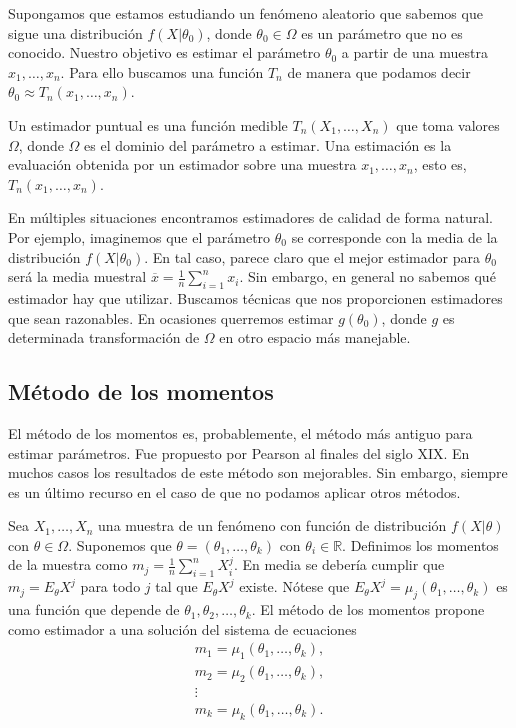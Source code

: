 \documentclass{article}
\begin{document}
Supongamos que estamos estudiando un fenómeno aleatorio que sabemos que sigue una distribución $f(X | \theta_0)$, donde $\theta_0 \in \Omega$ es un parámetro que no es conocido. Nuestro objetivo es estimar el parámetro $\theta_0$ a partir de una muestra $x_1, \ldots, x_n$. Para ello buscamos una función $T_n$ de manera que podamos decir $\theta_0 \approx T_n(x_1, \ldots, x_n)$.

\begin{definition}
    Un estimador puntual es una función medible $T_n(X_1, \ldots, X_n)$ que toma valores $\Omega$, donde $\Omega$ es el dominio del parámetro a estimar. Una estimación es la evaluación obtenida por un estimador sobre una muestra $x_1, \ldots, x_n$, esto es, $T_n(x_1, \ldots, x_n)$.
\end{definition}

En múltiples situaciones encontramos estimadores de calidad de forma natural. Por ejemplo, imaginemos que el parámetro $\theta_0$ se corresponde con la media de la distribución $f(X | \theta_0)$. En tal caso, parece claro que el mejor estimador para $\theta_0$ será la media muestral $\overline{x} = \frac{1}{n}\sum_{i = 1}^n x_i$. Sin embargo, en general no sabemos qué estimador hay que utilizar. Buscamos técnicas que nos proporcionen estimadores que sean razonables. En ocasiones querremos estimar $g(\theta_0)$, donde $g$ es determinada transformación de $\Omega$ en otro espacio más manejable.

\subsection{Método de los momentos}

El método de los momentos es, probablemente, el método más antiguo para estimar parámetros. Fue propuesto por Pearson al finales del siglo XIX. En muchos casos los resultados de este método son mejorables. Sin embargo, siempre es un último recurso en el caso de que no podamos aplicar otros métodos.

Sea $X_1, \ldots, X_n$ una muestra de un fenómeno con función de distribución $f(X |\theta)$ con $\theta \in \Omega$. Suponemos que $\theta = (\theta_1, \ldots, \theta_k)$ con $\theta_i \in \mathbb{R}$. Definimos los momentos de la muestra como $m_j = \frac{1}{n} \sum_{i = 1}^n X_i^j$. En media se debería cumplir que $m_j = E_\theta X^j$ para todo $j$ tal que $E_\theta X^j$ existe. Nótese que $E_\theta X^j = \mu_j(\theta_1, \ldots, \theta_k)$ es una función que depende de $\theta_1, \theta_2, \ldots, \theta_k$. El método de los momentos propone como estimador a una solución del sistema de ecuaciones
\begin{equation} \label{eq:sistema-momentos}
    \begin{matrix}
        m_1 = \mu_1(\theta_1, \ldots, \theta_k), \\
        m_2 = \mu_2(\theta_1, \ldots, \theta_k), \\
        \vdots \\
        m_k = \mu_k(\theta_1, \ldots, \theta_k). \\
    \end{matrix}
\end{equation}
\end{document}
